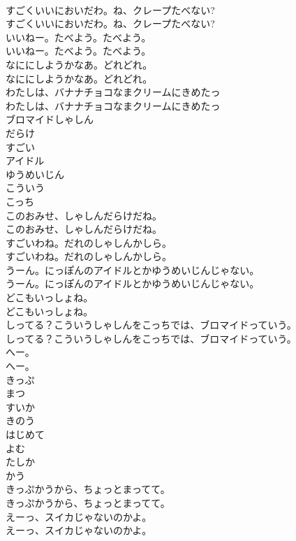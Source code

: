 \documentclass[8pt]{extreport}
\begin{document}
\begin{CJK}{UTF8}{min}
\\	すごくいいにおいだわ。ね、クレープたべない?
\\	すごくいいにおいだわ。ね、クレープたべない?
\\	いいねー。たべよう。たべよう。
\\	いいねー。たべよう。たべよう。
\\	なににしようかなあ。どれどれ。
\\	なににしようかなあ。どれどれ。
\\	わたしは、バナナチョコなまクリームにきめたっ
\\	わたしは、バナナチョコなまクリームにきめたっ
\\	ブロマイドしゃしん
\\	だらけ
\\	すごい
\\	アイドル
\\	ゆうめいじん
\\	こういう
\\	こっち
\\	このおみせ、しゃしんだらけだね。
\\	このおみせ、しゃしんだらけだね。
\\	すごいわね。だれのしゃしんかしら。
\\	すごいわね。だれのしゃしんかしら。
\\	うーん。にっぽんのアイドルとかゆうめいじんじゃない。
\\	うーん。にっぽんのアイドルとかゆうめいじんじゃない。
\\	どこもいっしょね。
\\	どこもいっしょね。
\\	しってる？こういうしゃしんをこっちでは、ブロマイドっていう。
\\	しってる？こういうしゃしんをこっちでは、ブロマイドっていう。
\\	へー。
\\	へー。
\\	きっぷ
\\	まつ
\\	すいか
\\	きのう
\\	はじめて
\\	よむ
\\	たしか
\\	かう
\\	きっぷかうから、ちょっとまってて。
\\	きっぷかうから、ちょっとまってて。
\\	えーっ、スイカじゃないのかよ。
\\	えーっ、スイカじゃないのかよ。

\end{CJK}
\end{document}
